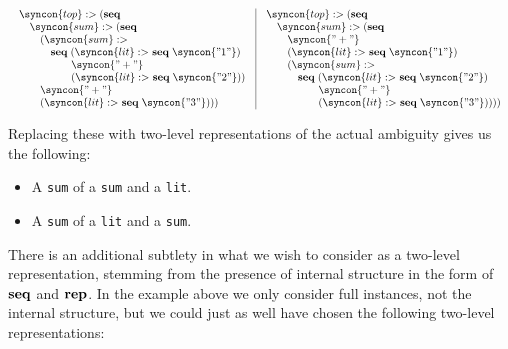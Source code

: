 \documentclass{kththesis}
\begin{document}
$$
\begin{array}{l|l}
\begin{array}{l}
\syncon{top} :> (\seq \\
\quad \syncon{sum} :> (\seq \\
\qquad (\syncon{sum} :> \\
\qquad \quad \seq (\syncon{lit} :>\ \seq \syncon{"1"}) \\
\qquad \quad \hphantom{\seq}\ \syncon{"+"} \\
\qquad \quad \hphantom{\seq}\ (\syncon{lit} :>\ \seq \syncon{"2"})) \\
\qquad \syncon{"+"} \\
\qquad (\syncon{lit} :>\ \seq \syncon{"3"}))) \\
\end{array}
&
\begin{array}{l}
\syncon{top} :> (\seq \\
\quad \syncon{sum} :> (\seq \\
\qquad \syncon{"+"} \\
\qquad (\syncon{lit} :>\ \seq \syncon{"1"}) \\
\qquad (\syncon{sum} :> \\
\qquad \quad \seq (\syncon{lit} :>\ \seq \syncon{"2"}) \\
\qquad \quad \hphantom{\seq}\ \syncon{"+"} \\
\qquad \quad \hphantom{\seq}\ (\syncon{lit} :>\ \seq \syncon{"3"})))) \\
\end{array}
\end{array}
$$

Replacing these with two-level representations of the actual ambiguity gives us the following:

\begin{itemize}
  \item A \texttt{sum} of a \texttt{sum} and a \texttt{lit}.
  \item A \texttt{sum} of a \texttt{lit} and a \texttt{sum}.
\end{itemize}

There is an additional subtlety in what we wish to consider as a two-level representation, stemming from the presence of internal structure in the form of $\mathrel{\mathbf{seq}}$ and $\mathrel{\mathbf{rep}}$. In the example above we only consider full instances, not the internal structure, but we could just as well have chosen the following two-level representations:
\end{document}
